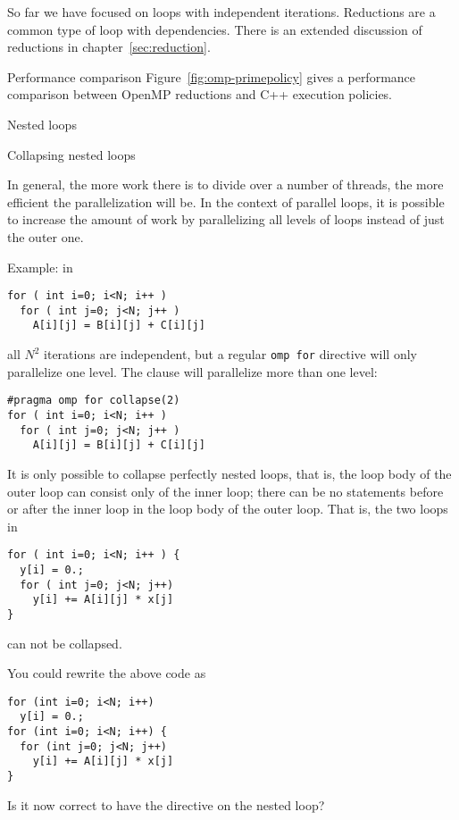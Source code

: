So far we have focused on loops with independent iterations.
Reductions are a common type of loop with dependencies.
There is an extended discussion of reductions in chapter~\ref{sec:reduction}.

\begin{cppnote}{Performance comparison}
  Figure~\ref{fig:omp-primepolicy} gives a performance comparison between
  OpenMP reductions and C++ execution policies.
\end{cppnote}

 {Nested loops}

 {Collapsing nested loops}

In general, the more work there is to divide over a number of threads,
the more efficient the parallelization will be. In the context of
parallel loops, it is possible to increase the amount of work by
parallelizing all levels of loops instead of just the outer one.

Example: in
\begin{lstlisting}
for ( int i=0; i<N; i++ )
  for ( int j=0; j<N; j++ )
    A[i][j] = B[i][j] + C[i][j] 
\end{lstlisting}
all $N^2$ iterations are independent, but a regular \lstinline{omp for}
directive will only parallelize one level. The 
clause will parallelize more than one level:
\begin{lstlisting}
#pragma omp for collapse(2)
for ( int i=0; i<N; i++ )
  for ( int j=0; j<N; j++ )
    A[i][j] = B[i][j] + C[i][j] 
\end{lstlisting}
It is only possible to collapse perfectly nested loops, that is, the
loop body of the outer loop can consist only of the inner loop; there
can be no statements before or after the inner loop in the loop body
of the outer loop. That is, the two loops in
\begin{lstlisting}
for ( int i=0; i<N; i++ ) {
  y[i] = 0.;
  for ( int j=0; j<N; j++)
    y[i] += A[i][j] * x[j]
}
\end{lstlisting}
can not be collapsed.

\begin{exercise}
  You could rewrite the above code as
\begin{lstlisting}
for (int i=0; i<N; i++)
  y[i] = 0.;
for (int i=0; i<N; i++) {
  for (int j=0; j<N; j++)
    y[i] += A[i][j] * x[j]
}
\end{lstlisting}
Is it now correct to have the  directive
on the nested loop?
\end{exercise}

